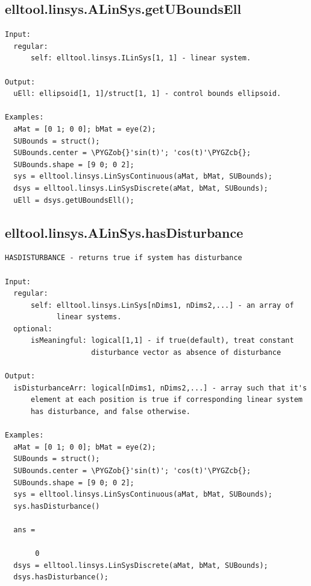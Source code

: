 \documentclass[letterpaper,10pt,english]{sphinxmanual}
\def\PYGZob{\char`\{}
\def\PYGZcb{\char`\}}
\begin{document}
\subsection{elltool.linsys.ALinSys.getUBoundsEll}
\label{chap_functions:elltool-linsys-alinsys-getuboundsell}
\begin{Verbatim}[commandchars=\\\{\}]
Input:
  regular:
      self: elltool.linsys.ILinSys[1, 1] - linear system.

Output:
  uEll: ellipsoid[1, 1]/struct[1, 1] - control bounds ellipsoid.

Examples:
  aMat = [0 1; 0 0]; bMat = eye(2);
  SUBounds = struct();
  SUBounds.center = \PYGZob{}'sin(t)'; 'cos(t)'\PYGZcb{};
  SUBounds.shape = [9 0; 0 2];
  sys = elltool.linsys.LinSysContinuous(aMat, bMat, SUBounds);
  dsys = elltool.linsys.LinSysDiscrete(aMat, bMat, SUBounds);
  uEll = dsys.getUBoundsEll();
\end{Verbatim}


\subsection{elltool.linsys.ALinSys.hasDisturbance}
\label{chap_functions:elltool-linsys-alinsys-hasdisturbance}
\begin{Verbatim}[commandchars=\\\{\}]
HASDISTURBANCE - returns true if system has disturbance

Input:
  regular:
      self: elltool.linsys.LinSys[nDims1, nDims2,...] - an array of
            linear systems.
  optional:
      isMeaningful: logical[1,1] - if true(default), treat constant
                    disturbance vector as absence of disturbance

Output:
  isDisturbanceArr: logical[nDims1, nDims2,...] - array such that it's
      element at each position is true if corresponding linear system
      has disturbance, and false otherwise.

Examples:
  aMat = [0 1; 0 0]; bMat = eye(2);
  SUBounds = struct();
  SUBounds.center = \PYGZob{}'sin(t)'; 'cos(t)'\PYGZcb{};
  SUBounds.shape = [9 0; 0 2];
  sys = elltool.linsys.LinSysContinuous(aMat, bMat, SUBounds);
  sys.hasDisturbance()

  ans =

       0
  dsys = elltool.linsys.LinSysDiscrete(aMat, bMat, SUBounds);
  dsys.hasDisturbance();
\end{Verbatim}
\end{document}
